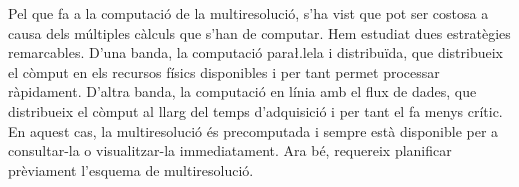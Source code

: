 Pel que fa a la computació de la multiresolució, s'ha vist que pot ser
costosa a causa dels múltiples càlculs que s'han de computar. Hem
estudiat dues estratègies remarcables.  D'una banda, la computació
para\l.lela i distribuïda, que distribueix el còmput en els recursos
físics disponibles i per tant permet processar ràpidament.  D'altra
banda, la computació en línia amb el flux de dades, que distribueix el
còmput al llarg del temps d'adquisició i per tant el fa menys crític.
En aquest cas, la multiresolució és precomputada i sempre està
disponible per a consultar-la o visualitzar-la immediatament. Ara bé,
requereix planificar prèviament l'esquema de multiresolució.



















